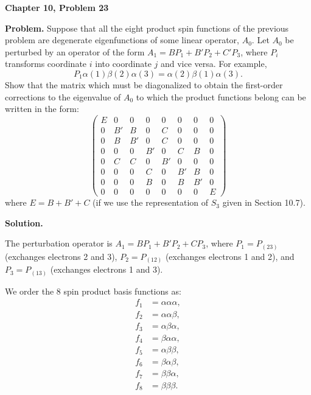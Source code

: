 \documentclass[12pt]{article}
\begin{document}
\begin{center}
{\Large\bfseries Chapter 10, Problem 23}
\end{center}

\noindent\textbf{Problem.} Suppose that all the eight product spin functions of the previous problem are degenerate eigenfunctions of some linear operator, $A_0$. Let $A_0$ be perturbed by an operator of the form $A_1 = B P_1 + B' P_2 + C' P_3$, where $P_i$ transforms coordinate $i$ into coordinate $j$ and vice versa. For example,
\[
P_1 \alpha(1)\beta(2)\alpha(3) = \alpha(2)\beta(1)\alpha(3).
\]
Show that the matrix which must be diagonalized to obtain the first-order corrections to the eigenvalue of $A_0$ to which the product functions belong can be written in the form:
\[
\begin{pmatrix}
E & 0 & 0 & 0 & 0 & 0 & 0 & 0 \\
0 & B' & B & 0 & C & 0 & 0 & 0 \\
0 & B & B' & 0 & C & 0 & 0 & 0 \\
0 & 0 & 0 & B' & 0 & C & B & 0 \\
0 & C & C & 0 & B' & 0 & 0 & 0 \\
0 & 0 & 0 & C & 0 & B' & B & 0 \\
0 & 0 & 0 & B & 0 & B & B' & 0 \\
0 & 0 & 0 & 0 & 0 & 0 & 0 & E
\end{pmatrix}
\]
where $E = B + B' + C$ (if we use the representation of $S_3$ given in Section 10.7).

\bigskip
\noindent\textbf{Solution.}

The perturbation operator is $A_1 = BP_1 + B'P_2 + CP_3$, where $P_1 = P_{(23)}$ (exchanges electrons 2 and 3), $P_2 = P_{(12)}$ (exchanges electrons 1 and 2), and $P_3 = P_{(13)}$ (exchanges electrons 1 and 3).

We order the 8 spin product basis functions as:
\[
\begin{array}{rl}
f_1 &= \alpha\alpha\alpha, \\
f_2 &= \alpha\alpha\beta, \\
f_3 &= \alpha\beta\alpha, \\
f_4 &= \beta\alpha\alpha, \\
f_5 &= \alpha\beta\beta, \\
f_6 &= \beta\alpha\beta, \\
f_7 &= \beta\beta\alpha, \\
f_8 &= \beta\beta\beta.
\end{array}
\]
\end{document}
